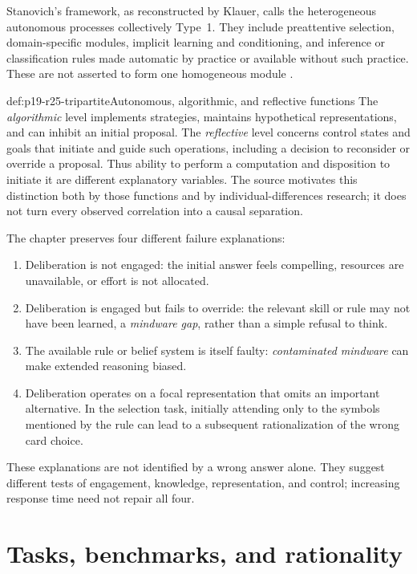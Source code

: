 Stanovich's framework, as reconstructed by Klauer, calls the heterogeneous
autonomous processes collectively Type~1. They include preattentive
selection, domain-specific modules, implicit learning and conditioning,
and inference or classification rules made automatic by practice or
available without such practice. These are not asserted to form one
homogeneous module \cite[p.~174]{Klauer2021DualProcess}.

\begin{hbdefinition}{def:p19-r25-tripartite}{Autonomous, algorithmic, and reflective functions}
The \emph{algorithmic} level implements strategies, maintains hypothetical
representations, and can inhibit an initial proposal. The \emph{reflective}
level concerns control states and goals that initiate and guide such
operations, including a decision to reconsider or override a proposal.
Thus ability to perform a computation and disposition to initiate it are
different explanatory variables. The source motivates this distinction
both by those functions and by individual-differences research; it does
not turn every observed correlation into a causal separation.
\end{hbdefinition}

The chapter preserves four different failure explanations:
\begin{enumerate}
\item Deliberation is not engaged: the initial answer feels compelling,
      resources are unavailable, or effort is not allocated.
\item Deliberation is engaged but fails to override: the relevant skill
      or rule may not have been learned, a \emph{mindware gap}, rather
      than a simple refusal to think.
\item The available rule or belief system is itself faulty:
      \emph{contaminated mindware} can make extended reasoning biased.
\item Deliberation operates on a focal representation that omits an
      important alternative. In the selection task, initially attending
      only to the symbols mentioned by the rule can lead to a subsequent
      rationalization of the wrong card choice.
\end{enumerate}
These explanations are not identified by a wrong answer alone. They
suggest different tests of engagement, knowledge, representation, and
control; increasing response time need not repair all four.

\section{Tasks, benchmarks, and rationality}

